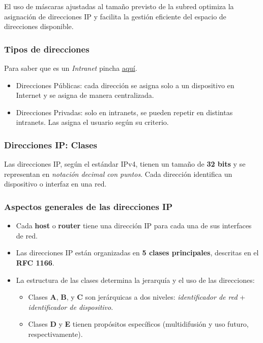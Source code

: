 \documentclass[a4paper,12pt]{article}
\begin{document}
El uso de máscaras ajustadas al tamaño previsto de la subred optimiza la asignación de direcciones IP y facilita la gestión eficiente del espacio de direcciones disponible.


\subsubsection{Tipos de direcciones}
Para saber que es un \textit{Intranet} pincha \href{https://github.com/ElblogdeIsmael/ElblogdeIsmael.github.io/blob/main/Subjects/Third/FR/Resumenes/ETSIIT/intranet.md}{aquí}.
\begin{itemize}
    \item Direcciones Públicas: cada dirección se asigna solo a un dispositivo en Internet y se asigna de manera centralizada.
    \item Direcciones Privadas: solo en intranets, se pueden repetir en distintas intranets. Las asigna el usuario según su criterio.
\end{itemize}



\subsubsection{Direcciones IP: Clases}

Las direcciones IP, según el estándar IPv4, tienen un tamaño de \textbf{32 bits} y se representan en \textit{notación decimal con puntos}. Cada dirección identifica un dispositivo o interfaz en una red. 

\subsubsection*{Aspectos generales de las direcciones IP}
\begin{itemize}
    \item Cada \textbf{host} o \textbf{router} tiene una dirección IP para cada una de sus interfaces de red.
    \item Las direcciones IP están organizadas en \textbf{5 clases principales}, descritas en el \textbf{RFC 1166}.
    \item La estructura de las clases determina la jerarquía y el uso de las direcciones:
    \begin{itemize}
        \item Clases \textbf{A}, \textbf{B}, y \textbf{C} son jerárquicas a dos niveles: \textit{identificador de red} + \textit{identificador de dispositivo}.
        \item Clases \textbf{D} y \textbf{E} tienen propósitos específicos (multidifusión y uso futuro, respectivamente).
    \end{itemize}
\end{itemize}
\end{document}
